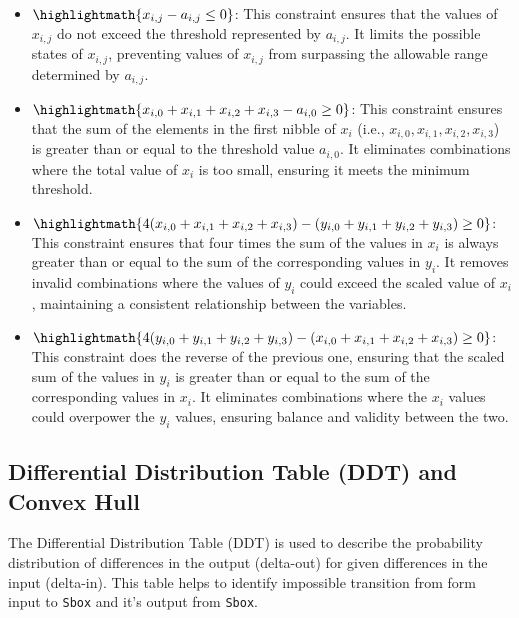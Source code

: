 \begin{itemize}
    \item \( \highlightmath{x_{i,j} - a_{i,j} \leq 0} \):
          This constraint ensures that the values of \(x_{i,j}\) do not exceed the threshold represented by \(a_{i,j}\). It limits the possible states of \(x_{i,j}\), preventing values of \(x_{i,j}\) from surpassing the allowable range determined by \(a_{i,j}\).

    \item \(\highlightmath{x_{i,0} + x_{i,1} + x_{i,2} + x_{i,3} - a_{i,0} \geq 0}\):
          This constraint ensures that the sum of the elements in the first nibble of \(x_i\) (i.e., \(x_{i,0}, x_{i,1}, x_{i,2}, x_{i,3}\)) is greater than or equal to the threshold value \(a_{i,0}\). It eliminates combinations where the total value of \(x_i\) is too small, ensuring it meets the minimum threshold.

    \item \(\highlightmath{4(x_{i,0} + x_{i,1} + x_{i,2} + x_{i,3}) - (y_{i,0} + y_{i,1} + y_{i,2} + y_{i,3}) \geq 0}\):
          This constraint ensures that four times the sum of the values in \(x_i\) is always greater than or equal to the sum of the corresponding values in \(y_i\). It removes invalid combinations where the values of \(y_i\) could exceed the scaled value of \(x_i\), maintaining a consistent relationship between the variables.

    \item \(\highlightmath{4(y_{i,0} + y_{i,1} + y_{i,2} + y_{i,3}) - (x_{i,0} + x_{i,1} + x_{i,2} + x_{i,3}) \geq 0}\):
          This constraint does the reverse of the previous one, ensuring that the scaled sum of the values in \(y_i\) is greater than or equal to the sum of the corresponding values in \(x_i\). It eliminates combinations where the \(x_i\) values could overpower the \(y_i\) values, ensuring balance and validity between the two.

\end{itemize}


\subsection*{Differential Distribution Table (DDT) and Convex Hull}

The Differential Distribution Table (DDT) is used to describe the probability
distribution of differences in the output (delta-out) for given differences in
the input (delta-in). This table helps to identify impossible transition from
form input to \texttt{Sbox} and it's output from \texttt{Sbox}.

